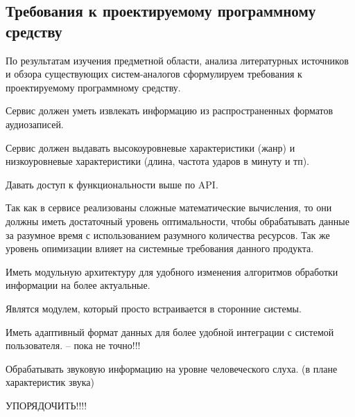 \subsection{Требования к проектируемому программному средству}
\label{sec:analysis:specification}

По результатам изучения предметной области, анализа литературных источников и обзора существующих систем-аналогов сформулируем требования к проектируемому программному средству.

Сервис должен уметь извлекать информацию из распространенных форматов аудиозаписей.

Сервис должен выдавать высокоуровневые характеристики (жанр) и низкоуровневые характеристики (длина, частота ударов в минуту и тп).

Давать доступ к функциональности выше по API.

Так как в сервисе реализованы сложные математические вычисления, то они должны иметь достаточный уровень оптимальности, чтобы обрабатывать данные за разумное время с использованием разумного количества ресурсов. Так же уровень опимизации влияет на системные требования данного продукта.

Иметь модульную архитектуру для удобного изменения алгоритмов обработки информации на более актуальные.

Являтся модулем, который просто встраивается в сторонние системы.

Иметь адаптивный формат данных для более удобной интеграции с системой пользователя. -- пока не точно!!!

Обрабатывать звуковую информацию на уровне человеческого слуха. (в плане характеристик звука)

УПОРЯДОЧИТЬ!!!!
